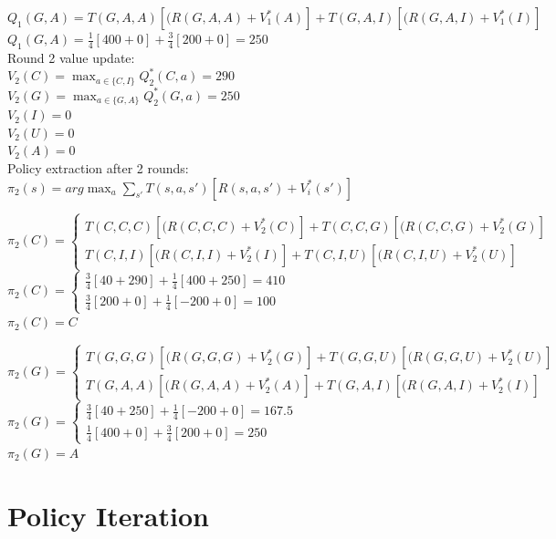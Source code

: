\documentclass[12pt]{article}
\begin{document}
\noindent
$Q_1(G,A) = T(G,A,A)[(R(G,A,A)+V_1^*(A)]+T(G,A,I)[(R(G,A,I)+V_1^*(I)]$ \\
$Q_1(G,A) = \frac{1}{4} [400 + 0] + \frac{3}{4} [200 + 0] = 250$ \\

\noindent
Round 2 value update: \\
$V_2(C) = \max_{a \in \{C, I\}} Q_2^*(C,a) = 290$ \\
$V_2(G) = \max_{a \in \{G, A\}} Q_2^*(G,a) = 250$ \\ 
$V_2(I) = 0$ \\ 
$V_2(U) = 0$ \\ 
$V_2(A) = 0$ \\ 




\noindent
Policy extraction after 2 rounds: \\
$\pi_2(s) = arg \max_{a} \sum_{s'}T(s,a,s')[R(s,a,s') + V_i^*(s')]$


$\pi_2(C) =
  \begin{cases}
   T(C,C,C)[(R(C,C,C)+V_2^*(C)]+T(C,C,G)[(R(C,C,G)+V_2^*(G)] \\
   T(C,I,I)[(R(C,I,I)+V_2^*(I)]+T(C,I,U)[(R(C,I,U)+V_2^*(U)]
  \end{cases}
$ \\
$\pi_2(C) =
  \begin{cases}
    \frac{3}{4} [40 + 290] + \frac{1}{4} [400 + 250] = 410 \\
    \frac{3}{4} [200 + 0] + \frac{1}{4} [-200 + 0] = 100
  \end{cases}
$ \\
$\pi_2(C) = C$

$\pi_2(G) =
  \begin{cases}
   T(G,G,G)[(R(G,G,G)+V_2^*(G)]+T(G,G,U)[(R(G,G,U)+V_2^*(U)] \\
   T(G,A,A)[(R(G,A,A)+V_2^*(A)]+T(G,A,I)[(R(G,A,I)+V_2^*(I)]
  \end{cases}
$ \\
$\pi_2(G) =
  \begin{cases}
    \frac{3}{4} [40 + 250] + \frac{1}{4} [-200 + 0] = 167.5 \\
    \frac{1}{4} [400 + 0] + \frac{3}{4} [200 + 0] = 250
  \end{cases}
$ \\
$\pi_2(G) = A$


\clearpage

\section{Policy Iteration}
\end{document}
